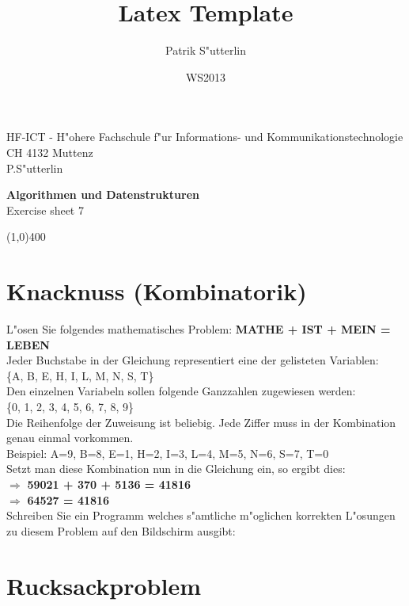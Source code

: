 \documentclass[a4paper,10pt]{article}
\title{Latex Template}
\author{Patrik S"utterlin}
\date{WS2013}
\begin{document}
HF-ICT - H"ohere Fachschule f"ur Informations- und Kommunikationstechnologie\\
CH 4132 Muttenz\\
P.S"utterlin

\vspace{2mm}

\begin{center}
{\Large \bf Algorithmen und Datenstrukturen}\\
Exercise sheet 7
\end{center}

\vspace{2mm}

\line(1,0){400}

\vspace{5mm}

\section{Knacknuss (Kombinatorik)}

L"osen Sie folgendes mathematisches Problem: \textbf{MATHE + IST + MEIN = LEBEN} \\

Jeder Buchstabe in der Gleichung representiert eine der gelisteten Variablen: \\ \{A, B, E, H, I, L, M, N, S, T\} \\
Den einzelnen Variabeln sollen folgende Ganzzahlen zugewiesen werden: \\ \{0, 1, 2, 3, 4, 5, 6, 7, 8, 9\} \\

Die Reihenfolge der Zuweisung ist beliebig. Jede Ziffer muss in der Kombination genau einmal vorkommen. \\

Beispiel: A=9, B=8, E=1, H=2, I=3, L=4, M=5, N=6, S=7, T=0 \\

Setzt man diese Kombination nun in die Gleichung ein, so ergibt dies: \\ $\Rightarrow$ \textbf{59021 + 370 + 5136 = 41816} \\ 
$\Rightarrow$ \textbf{64527 = 41816} \\ 

Schreiben Sie ein Programm welches s"amtliche m"oglichen korrekten L"osungen zu diesem Problem auf den Bildschirm ausgibt:

{ \small

}

\section{Rucksackproblem}
\end{document}
